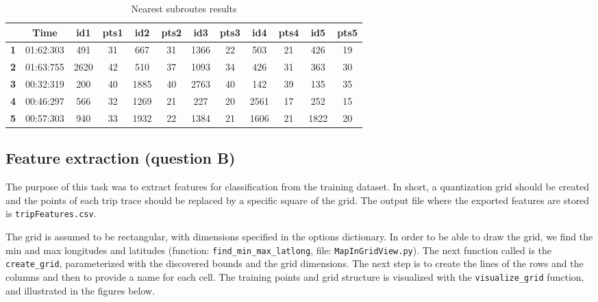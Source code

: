 \documentclass[12pt]{article}
\begin{document}
	\begin{table}[H]
		\centering
		\begin{tabular}{|c|c|c|c|c|c|c|c|c|c|c|c|}
			\hline
			\textbf{}  & \textbf{Time} & \textbf{id1} & \textbf{pts1} & \textbf{id2} & \textbf{pts2} & \textbf{id3} & \textbf{pts3} & \textbf{id4} & \textbf{pts4} & \textbf{id5} & \textbf{pts5} \\ \hline
			\textbf{1} & 01:62:303     & 491          & 31            & 667          & 31            & 1366         & 22            & 503          & 21            & 426          & 19            \\ \hline
			\textbf{2} & 01:63:755     & 2620         & 42            & 510          & 37            & 1093         & 34            & 426          & 31            & 363          & 30            \\ \hline
			\textbf{3} & 00:32:319     & 200          & 40            & 1885         & 40            & 2763         & 40            & 142          & 39            & 135          & 35            \\ \hline
			\textbf{4} & 00:46:297     & 566          & 32            & 1269         & 21            & 227          & 20            & 2561         & 17            & 252          & 15            \\ \hline
			\textbf{5} & 00:57:303     & 940          & 33            & 1932         & 22            & 1384         & 21            & 1606         & 21            & 1822         & 20            \\ \hline
		\end{tabular}
	\caption{Nearest subroutes results}
	\label{subres}
	\end{table}
	
	\subsection{Feature extraction (question B)}
	The purpose of this task was to extract features for classification from the
  training dataset. In short, a quantization grid should be created and the points of each trip trace should be replaced by a specific square of the grid. The output file where the exported features are stored is \texttt{tripFeatures.csv}.
	
The grid is assumed to be rectangular, with dimensions specified in the options
dictionary. In order to be able to draw the grid, we find the min and max
longitudes and latitudes (function: \texttt{find\_min\_max\_latlong}, file:
\texttt{MapInGridView.py}). The next function called is the
\texttt{create\_grid}, parameterized with the discovered bounds and the grid
dimensions. The next step is to create the lines of the rows and the columns and
then to provide a name for each cell. The training points and grid structure is
visualized with the \texttt{visualize\_grid} function, and illustrated in the
figures below.
	
\end{document}
